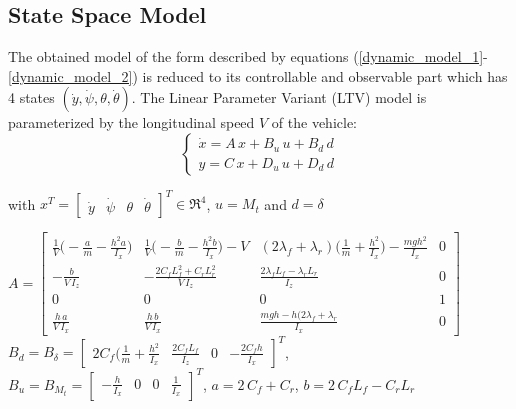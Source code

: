 \subsection{State Space Model}
The obtained model of the form described by equations (\ref{dynamic_model_1}-\ref{dynamic_model_2}) is reduced to its controllable and observable part which has 4 states $(\dot{y},\dot{\psi},\theta,\dot{\theta})$.
The Linear Parameter Variant (LTV) model is parameterized by the longitudinal speed $V$ of the vehicle:
\begin{equation}
\begin{cases}\dot{x}=A\,x+B_{u}\,u+B_{d}\,d\\ y=C\,x+D_{u}\,u+D_{d}\,d\end{cases}
\end{equation}

with $x^{T}=\begin{bmatrix}
\dot{y} & \dot{\psi} & \theta & \dot{\theta}
\end{bmatrix}^{T} \in \Re^4$, $u=M_{t}$ and $d=\delta$

$A=\begin{bmatrix} 
\frac{1}{V}\big(-\frac{a}{m}-\frac{h^{2}a}{I_{x}}\big) & \frac{1}{V}\big(-\frac{b}{m}-\frac{h^{2}b}{I_{x}}\big)-V & (2\lambda_{f}+\lambda_{r})\big(\frac{1}{m}+\frac{h^2}{I_{x}}\big)-\frac{mgh^2}{I_{x}} & 0\\
-\frac{b}{V\,I_{z}} & -\frac{2C_{f}L_{f}^{2}+C_{r}L_{r}^{2}}{V\,I_{z}} & \frac{2\lambda_{f}L_{f}-\lambda_{r}L_{r}}{I_{z}} & 0\\
0 & 0 & 0 & 1\\
\frac{h\,a}{V\,I_{x}} & \frac{h\,b}{V\,I_{x}} & \frac{mgh-h(2\lambda_{f}+\lambda_{r}}{I_{x}} & 0
\end{bmatrix}
$\\[10pt]
$B_{d}=B_{\delta}=\begin{bmatrix} 2C_{f}\big(\frac{1}{m}+\frac{h^2}{I_{x}} & \frac{2C_{f}L_{f}}{I_{z}} & 0 & -\frac{2C_{f}h}{I_{x}} \end{bmatrix}^{T}$,\\[10pt]
$B_{u}=B_{M_{t}}=\begin{bmatrix} -\frac{h}{I_{x}} & 0 & 0 & \frac{1}{I_{x}} \end{bmatrix}^{T}$, $a=2\,C_{f}+C_{r}$, $b=2\,C_{f}L_{f}-C_{r}L_{r}$

